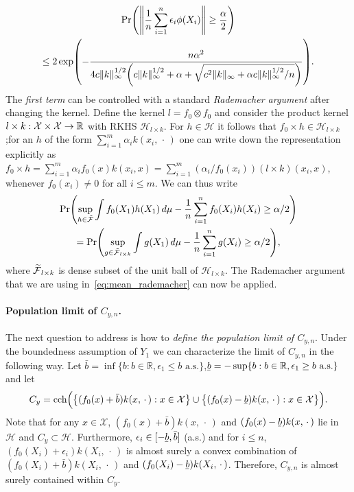 \documentclass[AHL,Unicode,longabstracts,published]{cedram}
\theoremstyle{remark}
\DeclareMathOperator{\cch}{cch}
\newcommand{\R}{\mathbb{R}}
\newcommand{\X}{\mathcal{X}}
\newcommand{\cH}{\mathcal{H}}
\newcommand{\clF}{\mathcal{F}}
\newcommand{\ubar}[1]{\underaccent{\bar}{#1}}
\let\oldtilde\tilde
\renewcommand*{\tilde}[1]{\mathchoice{\widetilde{#1}}{\widetilde{#1}}{\oldtilde{#1}}{\oldtilde{#1}}}
\renewcommand*{\to}{\mathchoice{\longrightarrow}{\rightarrow}{\rightarrow}{\rightarrow}}
\let\originalleft\left
\let\originalright\right
\renewcommand{\left}{\mathopen{}\mathclose\bgroup\originalleft}
\renewcommand{\right}{\aftergroup\egroup\originalright}
\begin{document}
\begin{multline}\label{eq:bernstein_phi}
\Pr\left(\left \| \frac{1}{n} \sum_{i=1}^n \epsilon_i \phi(X_i) \right\|
\geq \frac{\alpha}{2} \right)\\ \leq 2 \exp\left(-\frac{n \alpha^2}{4 c \|k\|^{1/2}_\infty \left(c \|k\|^{1/2}_\infty +\alpha + \sqrt{c^2 \|k\|_\infty + \alpha c \|k\|^{1/2}_\infty /n}\right)}
\right).
\end{multline}
The \emph{first term} can be controlled with a standard \emph{Rademacher argument} after changing the kernel. Define the kernel $l = f_0 \otimes f_0$ and consider the product kernel $l \times k : \X \times \X \to \R$ with RKHS $\cH_{l \times k}$. For $h\in \cH$ it follows that $f_0 \times h \in \cH_{l \times k}$;\linebreak for an $h$ of the form $\sum_{i=1}^m \alpha_i k(x_i,\,\cdot\,)$ one can write down the representation explicitly as $f_0 \times h = \sum_{i=1}^m \alpha_i f_0(x) k(x_i,x) = \sum_{i=1}^m (\alpha_i/f_0(x_i)) (l \times k)(x_i,x)$, whenever $f_0(x_i) \not = 0$ for all $i\leq m$. We can thus write
\begin{multline}\label{eq:mean_y_n_vs_y_second}
\Pr\left(\sup_{h \in \tilde{\clF}} \int f_0(X_1) h(X_1) \, d\mu - \frac{1}{n} \sum_{i=1}^n f_0(X_i) h(X_i) \geq \alpha/2\right)\\
= \Pr\left(\sup_{g \in \tilde{\clF}_{l\times k}} \int g(X_1) \, d\mu - \frac{1}{n} \sum_{i=1}^n g(X_i) \geq \alpha/2\right),
\end{multline}
where $\tilde{\clF}_{l\times k}$ is dense subset of the unit ball of $\cH_{l \times k}$. The Rademacher argument that we are using in~\eqref{eq:mean_rademacher} can now be applied.


\paragraph{Population limit of $C_{y,n}$.} The next question to address is how to \emph{define the population limit of $C_{y,n}$}. Under the boundedness assumption of $Y_1$ we can characterize the limit of $C_{y,n}$ in the following way. Let $\bar b = \inf\{b : b \in \R, \epsilon_1 \leq b \text{ a.s.} \}$,\linebreak $\ubar{b} = - \sup\{b : b \in \R, \epsilon_1 \geq b \text{ a.s.} \}$ and let
\[
C_y = \cch\Bigl(\bigl\{ (f_0(x) + \bar b) k(x,\,\cdot\,) : x \in \X \bigr\} \cup \bigl\{ (f_0(x) - \ubar b) k(x,\,\cdot\,) : x \in \X \bigr\}\Bigr).
\]
Note that for any $x\in \X$, $(f_0(x) + \bar b) k(x,\,\cdot\,)$ and $(f_0(x) - \ubar{b}) k(x,\,\cdot\,)$ lie in $\cH$ and $C_y \subset \cH$. Furthermore, $\epsilon_i \in [-\ubar{b},\bar b]$ (a.s.) and for $i\leq n$, $(f_0(X_i) + \epsilon_i) k(X_i,\,\cdot\,)$ is almost surely a convex combination of $(f_0(X_i) + \bar b) k(X_i,\,\cdot\,)$ and $(f_0(X_i) - \ubar{b}) k(X_i,\,\cdot\,)$. Therefore, $C_{y,n}$ is almost surely contained within $C_y$.
\end{document}
